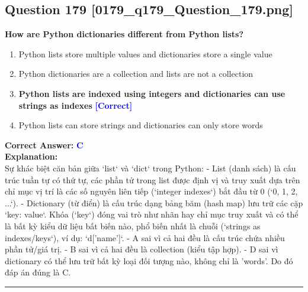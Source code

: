 \documentclass[11pt,a4paper]{article}
\begin{document}
\begin{minipage}{\textwidth}
\subsection*{Question 179 \quad \footnotesize{[0179_q179_Question_179.png]}}
\noindent \textbf{How are Python dictionaries different from Python lists?}

\begin{enumerate}[label=\Alph*.]
    \item Python lists store multiple values and dictionaries store a single value
    \item Python dictionaries are a collection and lists are not a collection
    \item \textbf{Python lists are indexed using integers and dictionaries can use strings as indexes} \hfill \textcolor{blue}{\textbf{[Correct]}}
    \item Python lists can store strings and dictionaries can only store words
\end{enumerate}

\noindent \textbf{Correct Answer:} \textcolor{blue}{\textbf{C}} \\[4pt]
\noindent \textbf{Explanation:}\\
Sự khác biệt căn bản giữa `list` và `dict` trong Python:\newline
- List (danh sách) là cấu trúc tuần tự có thứ tự, các phần tử trong list được định vị và truy xuất dựa trên chỉ mục vị trí là các số nguyên liên tiếp (`integer indexes`) bắt đầu từ 0 (`0, 1, 2, ...`).\newline
- Dictionary (từ điển) là cấu trúc dạng bảng băm (hash map) lưu trữ các cặp `key: value`. Khóa (`key`) đóng vai trò như nhãn hay chỉ mục truy xuất và có thể là bất kỳ kiểu dữ liệu bất biến nào, phổ biến nhất là chuỗi (`strings as indexes/keys`), ví dụ: `d['name']`.\newline
- A sai vì cả hai đều là cấu trúc chứa nhiều phần tử/giá trị.\newline
- B sai vì cả hai đều là collection (kiểu tập hợp).\newline
- D sai vì dictionary có thể lưu trữ bất kỳ loại đối tượng nào, không chỉ là 'words'.\newline
Do đó đáp án đúng là C.
\end{minipage}
\vspace{0.8cm}
\hrule
\vspace{0.5cm}
\end{document}
